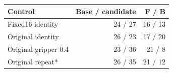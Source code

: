 \begin{tabularx}{\linewidth}{@{}Xrr@{}}
\toprule
Control & Base / candidate & F / B \\
\midrule
Fixed16 identity & 24 / 27 & 16 / 13 \\
Original identity & 26 / 23 & 17 / 20 \\
Original gripper 0.4 & 23 / 36 & 21 / 8 \\
Original repeat* & 26 / 35 & 21 / 12 \\
\bottomrule
\end{tabularx}
